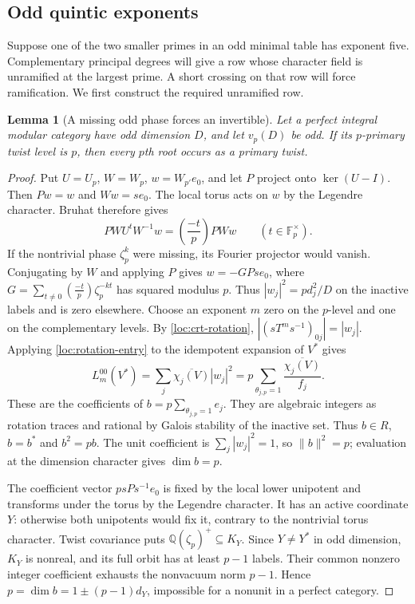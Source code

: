 \documentclass[11pt,a4paper]{article}
\numberwithin{equation}{section}
\newtheorem{lemma}[theorem]{Lemma}
\begin{document}
\subsection{Odd quintic exponents}

Suppose one of the two smaller primes in an odd minimal table has
exponent five. Complementary principal degrees will give a row whose
character field is unramified at the largest prime. A short crossing
on that row will force ramification. We first construct the required
unramified row.

\begin{lemma}[A missing odd phase forces an invertible]
\label{red:all-prime-phases}
Let a perfect integral modular category have odd dimension $D$, and
let $v_p(D)$ be odd. If its $p$-primary twist level is $p$, then every
$p$th root occurs as a primary twist.
\end{lemma}
\begin{proof}
Put $U=U_p$, $W=W_p$, $w=W_{p'}e_0$, and let $P$ project onto
$\ker(U-I)$. Then $Pw=w$ and $Ww=se_0$. The local torus acts on
$w$ by the Legendre character. Bruhat therefore gives
\[
 PWU^tW^{-1}w=\left(\frac{-t}{p}\right)PWw
 \qquad(t\in\mathbb F_p^\times).
\]
If the nontrivial phase $\zeta_p^k$ were missing, its Fourier
projector would vanish. Conjugating by $W$ and applying $P$ gives
$w=-G Pse_0$, where
$G=\sum_{t\ne0}(\frac{-t}{p})\zeta_p^{-kt}$ has squared modulus
$p$. Thus $|w_j|^2=p d_j^2/D$ on the inactive labels and is zero
elsewhere. Choose an exponent $m$ zero on the $p$-level and one on
the complementary levels. By \eqref{loc:crt-rotation},
$|(sT^ms^{-1})_{0j}|=|w_j|$. Applying \eqref{loc:rotation-entry}
to the idempotent expansion of $V^*$ gives
\[
 L_m^{00}(V^*)=\sum_j\overline{\chi_j(V)}|w_j|^2
        = p\sum_{\theta_{j,p}=1}\frac{\overline{\chi_j(V)}}{f_j}.
\]
These are the coefficients of $b=p\sum_{\theta_{j,p}=1}e_j$.
They are algebraic integers as rotation traces and rational by Galois
stability of the inactive set. Thus $b\in R$, $b=b^*$ and $b^2=pb$.
The unit coefficient is $\sum_j|w_j|^2=1$, so $\|b\|^2=p$;
evaluation at the dimension character gives $\dim b=p$.

The coefficient vector $p sPs^{-1}e_0$ is fixed by the local lower
unipotent and transforms under the torus by the Legendre character.
It has an active coordinate $Y$: otherwise both unipotents would
fix it, contrary to the nontrivial torus character. Twist covariance
puts $\mathbb Q(\zeta_p)^+\subseteq K_Y$. Since $Y\ne Y^*$ in odd
dimension, $K_Y$ is nonreal, and its full orbit has at least $p-1$
labels. Their common nonzero integer coefficient exhausts the
nonvacuum norm $p-1$. Hence
$p=\dim b=1\pm(p-1)d_Y$, impossible for a nonunit in a perfect
category.
\end{proof}
\end{document}
